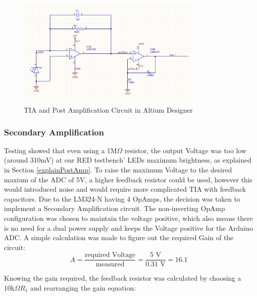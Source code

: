 %
\begin{figure}[htbp] %
    \centering
    \includegraphics[width=0.8\textwidth]{chapters/methodology/prototype/AltiumSingleCircuit_wCap.png}
    \caption{TIA and Post Amplification Circuit in Altium Designer}
    \label{fig:AltiumDis}
  \end{figure}
%
%
\subsubsection{Secondary Amplification}
\label{secondAmp}  
Testing showed that even using a 1M$\Omega$ resistor, the output Voltage was too low (around 310mV) at our \ac{RED} testbench' \acp{LED} maximum brightness, as explained in Section \ref{explainPostAmp}. To raise the maximum Voltage to the desired maxium of the ADC of 5V, a higher feedback resistor could be used, however this would introduced noise and would require more complicated TIA with feedback capacitors. Due to the LM324-N having 4 \acp{OpAmp}, the decision was taken to implement a Secondary Amplification circuit. The non-inverting \ac{OpAmp} configuration was chosen to maintain the voltage positive, which also means there is no need for a dual power supply and keeps the Voltage positive for the Arduino ADC.
A simple calculation was made to figure out the required Gain of the circuit:
\begin{equation} \label{gainCalc}
  A = \frac{\text{required Voltage}}{\text{measured}} = \frac{5\text{ V}}{0.31\text{ V}} = 16.1
  \end{equation}

Knowing the gain required, the feedback resistor was calculated by choosing a 10k$\Omega R_1$ and rearranging the gain equation:

